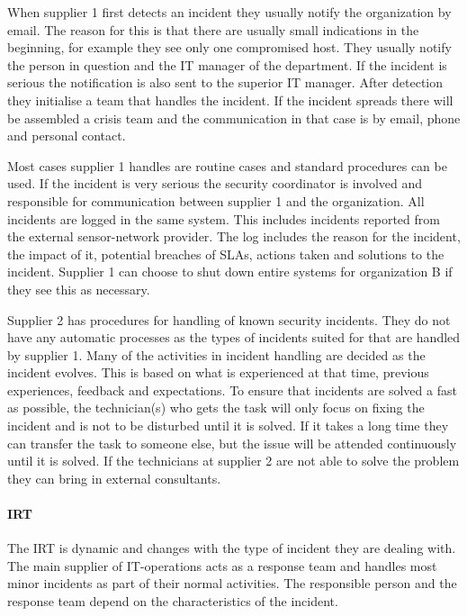 When supplier 1 first detects an incident they usually notify the organization by email. The reason for this is that there are usually small indications in the beginning, for example they see only one compromised host. They usually notify the person in question and the IT manager of the department. If the incident is serious the notification is also sent to the superior IT manager. After detection they initialise a team that handles the incident. If the incident spreads there will be assembled a crisis team and the communication in that case is by email, phone and personal contact. 

Most cases supplier 1 handles are routine cases and standard procedures can be used. If the incident is very serious the security coordinator is involved and responsible for communication between supplier 1 and the organization. All incidents are logged in the same system. This includes incidents reported from the external sensor-network provider. The log includes the reason for the incident, the impact of it, potential breaches of \acp{SLA}, actions taken and solutions to the incident. Supplier 1 can choose to shut down entire systems for organization B if they see this as necessary.

Supplier 2 has procedures for handling of known security incidents. They do not have any automatic processes as the types of incidents suited for that are handled by supplier 1. Many of the activities in incident handling are decided as the incident evolves. This is based on what is experienced at that time, previous experiences, feedback and expectations. To ensure that incidents are solved a fast as possible, the technician(s) who gets the task will only focus on fixing the incident and is not to be disturbed until it is solved. If it takes a long time they can transfer the task to someone else, but the issue will be attended continuously until it is solved. If the technicians at supplier 2 are not able to solve the problem they can bring in external consultants.

\paragraph{\acl{IRT}}
The \ac{IRT} is dynamic and changes with the type of incident they are dealing with. The main supplier of IT-operations acts as a response team and handles most minor incidents as part of their normal activities. The responsible person and the response team depend on the characteristics of the incident.   

